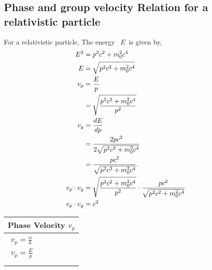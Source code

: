 \subsection{ Phase and group velocity Relation  for a relativistic particle}
For a relativistic particle, The energy \ $E$\ is given by,
\begin{align}
E^{2} &=p^{2} c^{2}+m_{0}^{2} c^{4} \\
E &=\sqrt{p^{2} c^{2}+m_{0}^{2} c^{4}}\notag \\
v_{p} &=\frac{E}{p} \\
&=\sqrt{\frac{p^{2} c^{2}+m_{0}^{2} c^{4}}{p^{2}}}\notag \\
v_{g} &=\frac{d E}{d p} \\
&=\frac{{2 p c^{2}}}{2 \sqrt{p^{2} c^{2}+m_{0}^{2} c^{4}}}\notag \\
&=\frac{p c^{2}}{\sqrt{p^{2} c^{2}+m_{0}^{2} c^{4}}} . \\
v_{p} \cdot v_{g}&=\sqrt{\frac{p^{2} c^{2}+m_{0}^{2} c^{4}}{p^{2}}}\cdot \frac{p c^{2}}{\sqrt{p^{2} c^{2}+m_{0}^{2} c^{4}}}\\
v_{p} \cdot v_{g}&=c^{2}
\end{align}
\begin{center}
\end{center}
\begin{minipage}{0.25\textwidth}
	\begin{table}[H]
		\centering
		\renewcommand{\arraystretch}{2.5}
		\begin{tabularx}{1\textwidth} { 
				| >{\centering\arraybackslash}X 
				|   }
			\hline
			\rowcolor{ocrel} \large \textbf{Phase Velocity $v_{p}$} \\
			\hline
			\hline
			$\begin{array}{l}
			v_{p} =\frac{\omega}{k} \\
			v_{p} =\frac{E}{p}\\
			\end{array}$\\ \hline
			
			
		\end{tabularx}
		
	\end{table}
\end{minipage}
